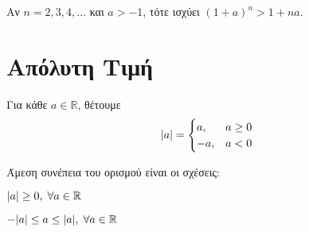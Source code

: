 \begin{rem}
  Αν $ n=2,3,4,\ldots $ και $ a>-1 $, τότε ισχύει $ (1+a)^{n}>1+na $.
\end{rem}

\section{Απόλυτη Τιμή}

\begin{dfn}
  Για κάθε $ a \in \mathbb{R} $, θέτουμε
  \[ \abs{a} = \begin{cases} a, & a \geq 0 \\ -a, & a < 0 \end{cases}  \]
\end{dfn}

\begin{rem}
  Άμεση συνέπεια του ορισμού είναι οι σχέσεις:
  \begin{myitemize}
    \item $ \abs{a} \geq 0, \;  \forall a \in \mathbb{R} $
    \item $ -\abs{a} \leq a \leq \abs{a}, \; \forall a \in \mathbb{R} $
  \end{myitemize}
\end{rem}

